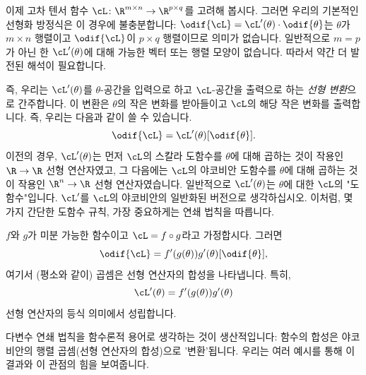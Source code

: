 \documentclass[../../book-main_ko.tex]{subfiles}
\begin{document}
이제 고차 텐서 함수 \(\cL \colon \R^{m \times n} \to \R^{p \times q}\)를 고려해 봅시다. 그러면 우리의 기본적인 선형화 방정식은 이 경우에 불충분합니다: \(\odif{\cL} = \cL^{\prime}(\theta) \cdot \odif{\theta}\)는 \(\theta\)가 \(m \times n\) 행렬이고 \(\odif{\cL}\)이 \(p \times q\) 행렬이므로 의미가 없습니다. 일반적으로 \(m = p\)가 아닌 한 \(\cL^{\prime}(\theta)\)에 대해 가능한 벡터 또는 행렬 모양이 없습니다. 따라서 약간 더 발전된 해석이 필요합니다.

즉, 우리는 \(\cL^{\prime}(\theta)\)를 \(\theta\)-공간을 입력으로 하고 \(\cL\)-공간을 출력으로 하는 \textit{선형 변환}으로 간주합니다. 이 변환은 \(\theta\)의 작은 변화를 받아들이고 \(\cL\)의 해당 작은 변화를 출력합니다. 즉, 우리는 다음과 같이 쓸 수 있습니다.
\begin{equation}
    \odif{\cL} = \cL^{\prime}(\theta)[\odif{\theta}].
\end{equation}
이전의 경우, \(\cL^{\prime}(\theta)\)는 먼저 \(\cL\)의 스칼라 도함수를 \(\theta\)에 대해 곱하는 것이 작용인 \(\R \to \R\) 선형 연산자였고, 그 다음에는 \(\cL\)의 야코비안 도함수를 \(\theta\)에 대해 곱하는 것이 작용인 \(\R^{n} \to \R\) 선형 연산자였습니다. 일반적으로 \(\cL^{\prime}(\theta)\)는 \(\theta\)에 대한 \(\cL\)의 "도함수"입니다.
\(\cL^{\prime}\)를 \(\cL\)의 야코비안의 일반화된 버전으로 생각하십시오.
이처럼, 몇 가지 간단한 도함수 규칙, 가장 중요하게는 연쇄 법칙을 따릅니다.

\begin{theorem}[미분 연쇄 법칙]
    \(f\)와 \(g\)가 미분 가능한 함수이고 \(\cL = f \circ g\)라고 가정합시다. 그러면
    \begin{equation}
        \odif{\cL} = f^{\prime}(g(\theta))g^{\prime}(\theta)[\odif{\theta}],
    \end{equation}
    여기서 (평소와 같이) 곱셈은 선형 연산자의 합성을 나타냅니다. 특히,
    \begin{equation}
        \cL^{\prime}(\theta) = f^{\prime}(g(\theta))g^{\prime}(\theta)
    \end{equation}
    선형 연산자의 등식 의미에서 성립합니다.
\end{theorem}

다변수 연쇄 법칙을 함수론적 용어로 생각하는 것이 생산적입니다:
함수의 합성은 야코비안의 행렬 곱셈(선형 연산자의 합성)으로 '변환'됩니다.
우리는 여러 예시를 통해 이 결과와 이 관점의 힘을 보여줍니다.
\end{document}
